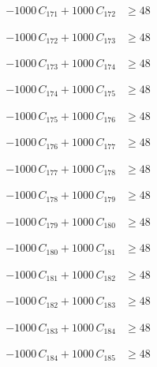 \documentclass[a4paper,11pt]{article}
\begin{document}
\begin{align}
-1000\,C_{171} + 1000\,C_{172} &\geq 48 \nonumber
\end{align}

\begin{align}
-1000\,C_{172} + 1000\,C_{173} &\geq 48 \nonumber
\end{align}

\begin{align}
-1000\,C_{173} + 1000\,C_{174} &\geq 48 \nonumber
\end{align}

\begin{align}
-1000\,C_{174} + 1000\,C_{175} &\geq 48 \nonumber
\end{align}

\begin{align}
-1000\,C_{175} + 1000\,C_{176} &\geq 48 \nonumber
\end{align}

\begin{align}
-1000\,C_{176} + 1000\,C_{177} &\geq 48 \nonumber
\end{align}

\begin{align}
-1000\,C_{177} + 1000\,C_{178} &\geq 48 \nonumber
\end{align}

\begin{align}
-1000\,C_{178} + 1000\,C_{179} &\geq 48 \nonumber
\end{align}

\begin{align}
-1000\,C_{179} + 1000\,C_{180} &\geq 48 \nonumber
\end{align}

\begin{align}
-1000\,C_{180} + 1000\,C_{181} &\geq 48 \nonumber
\end{align}

\begin{align}
-1000\,C_{181} + 1000\,C_{182} &\geq 48 \nonumber
\end{align}

\begin{align}
-1000\,C_{182} + 1000\,C_{183} &\geq 48 \nonumber
\end{align}

\begin{align}
-1000\,C_{183} + 1000\,C_{184} &\geq 48 \nonumber
\end{align}

\begin{align}
-1000\,C_{184} + 1000\,C_{185} &\geq 48 \nonumber
\end{align}
\end{document}
